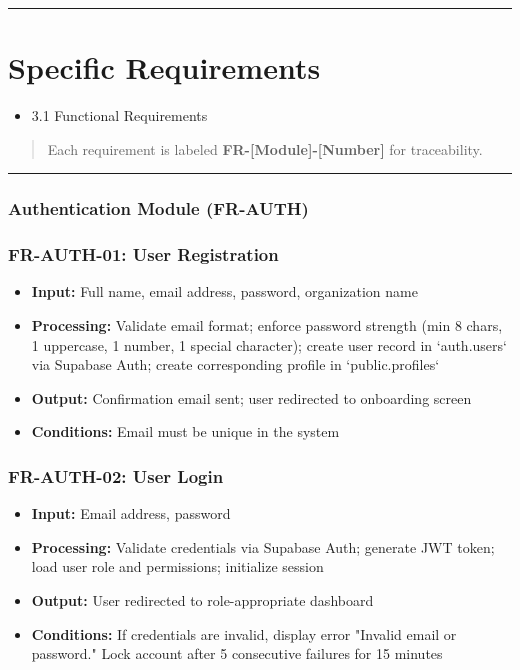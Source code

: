 \documentclass[journal, a4paper, onecolumn, 12pt]{IEEEtran}
\begin{document}
\vspace{1em}\hrule\vspace{1em}

\section{Specific Requirements}
\begin{itemize}[leftmargin=*]
\item 3.1 Functional Requirements
\end{itemize}

\begin{quote}
Each requirement is labeled \textbf{FR-[Module]-[Number]} for traceability.
\end{quote}

\vspace{1em}\hrule\vspace{1em}

\subsubsection{Authentication Module (FR-AUTH)}

\subsubsection{FR-AUTH-01: User Registration}
\begin{itemize}[leftmargin=*]
\item \textbf{Input:} Full name, email address, password, organization name
\item \textbf{Processing:} Validate email format; enforce password strength (min 8 chars, 1 uppercase, 1 number, 1 special character); create user record in `auth.users` via Supabase Auth; create corresponding profile in `public.profiles`
\item \textbf{Output:} Confirmation email sent; user redirected to onboarding screen
\item \textbf{Conditions:} Email must be unique in the system
\end{itemize}

\subsubsection{FR-AUTH-02: User Login}
\begin{itemize}[leftmargin=*]
\item \textbf{Input:} Email address, password
\item \textbf{Processing:} Validate credentials via Supabase Auth; generate JWT token; load user role and permissions; initialize session
\item \textbf{Output:} User redirected to role-appropriate dashboard
\item \textbf{Conditions:} If credentials are invalid, display error "Invalid email or password." Lock account after 5 consecutive failures for 15 minutes
\end{itemize}
\end{document}
